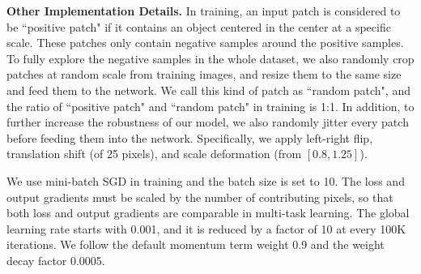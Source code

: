 \textbf{Other Implementation Details.} 
In training, an input patch is considered to be ``positive patch" if it contains an object centered in the center at a specific scale.  These patches only contain negative samples around the positive samples.  To fully explore the negative samples in the whole dataset, we also randomly crop patches at random scale from training images, and resize them to the same size and feed them to the network. We call this kind of patch as ``random patch", and the ratio of ``positive patch" and ``random patch" in training is 1:1.  In addition, to further increase the robustness of our model, we also randomly jitter every patch before feeding them into the network.  Specifically, we apply left-right flip, translation shift (of 25 pixels), and scale deformation (from $[0.8 , 1.25]$). 

We use mini-batch SGD in training and the batch size is set to 10. The loss and output gradients must be scaled by the number of contributing pixels, so that both loss and output gradients are comparable in multi-task learning. The global learning rate starts with 0.001, and it is reduced by a factor of 10 at every 100K iterations. We follow the default momentum term weight 0.9 and the weight decay factor 0.0005. 


